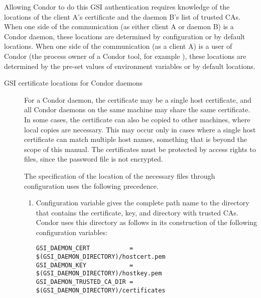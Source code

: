 Allowing Condor to do this GSI authentication
requires knowledge of the locations of
the client A's certificate and the daemon B's list of
trusted CAs.
When one side of the communication (as either client A or daemon B)
is a Condor daemon, these locations are determined
by configuration or by default locations.
When one side of the communication (as a client A)
is a user of Condor (the process owner of a Condor tool,
for example ), these locations are determined by the
pre-set values of environment variables or by default locations.

\begin{description}
\item[GSI certificate locations for Condor daemons]

For a Condor daemon, the certificate may be a single host certificate,
and all Condor daemons on the same machine may share the same certificate.
In some cases, the certificate can also be copied to other machines,
where local copies are necessary.
This may occur only in cases where a single host certificate can
match multiple host names, something that is beyond the scope of this
manual. 
The certificates must be protected by access rights to files,
since the password file is not encrypted.

The specification of the location of the necessary files
through configuration uses the following precedence.
\begin{enumerate}
\item
Configuration variable  gives the complete
path name to the directory that contains the certificate, key,
and directory with trusted CAs.
Condor uses this directory as follows in its construction of the following
configuration variables:
\footnotesize
\begin{verbatim}
GSI_DAEMON_CERT           = $(GSI_DAEMON_DIRECTORY)/hostcert.pem
GSI_DAEMON_KEY            = $(GSI_DAEMON_DIRECTORY)/hostkey.pem 
GSI_DAEMON_TRUSTED_CA_DIR = $(GSI_DAEMON_DIRECTORY)/certificates 
\end{verbatim}


\end{enumerate}
\end{description}
